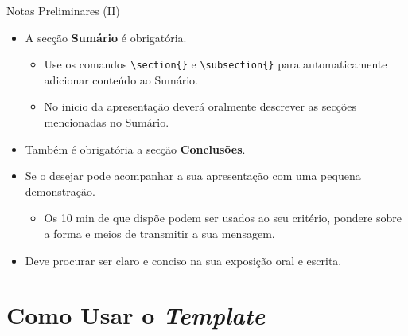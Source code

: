 \documentclass[
aspectratio=169,	%
LETI,				%
english,			%
]{DEEclassP}
\begin{document}
\begin{frame}[fragile]{Notas Preliminares (II)}

\setlstep{0.3cm}{0cm}{0cm}
\begin{itemize}
	\item A secção \textbf{Sumário} é obrigatória.
	\begin{itemize}
		\item Use os comandos \verb|\section{}| e \verb|\subsection{}| para automaticamente adicionar conteúdo ao Sumário.
		\item No inicio da apresentação deverá oralmente descrever as secções mencionadas no Sumário.
	\end{itemize}	
	\item Também é obrigatória a secção \textbf{Conclusões}.
	\item Se o desejar pode acompanhar a sua apresentação com uma pequena demonstração. 
	\begin{itemize}
		\item Os 10 min de que dispõe podem ser usados ao seu critério, pondere sobre a forma e meios de transmitir a sua mensagem.
	\end{itemize}
	\item Deve procurar ser claro e conciso na sua exposição oral e escrita.
\end{itemize}
\end{frame}

\section{Como Usar o \textit{Template}}
\end{document}
